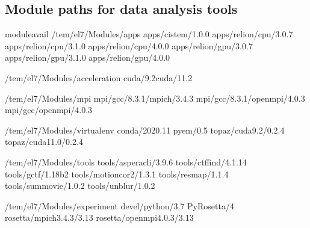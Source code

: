 \documentclass[a4paper,10pt,english]{sphinxmanual}
\begin{document}
\subsection{Module paths for data analysis tools}
\label{\detokenize{newfarm:module-paths-for-data-analysis-tools}}
\begin{sphinxVerbatim}[commandchars=\\\{\}]
\PYGZdl{}\PYGZgt{}moduleavail
\PYGZhy{}\PYGZhy{}\PYGZhy{}\PYGZhy{}\PYGZhy{}\PYGZhy{}\PYGZhy{}\PYGZhy{}/tem/el7/Modules/apps\PYGZhy{}\PYGZhy{}\PYGZhy{}\PYGZhy{}\PYGZhy{}\PYGZhy{}\PYGZhy{}\PYGZhy{}\PYGZhy{}
apps/cistem/1.0.0
apps/relion/cpu/3.0.7
apps/relion/cpu/3.1.0
apps/relion/cpu/4.0.0
apps/relion/gpu/3.0.7
apps/relion/gpu/3.1.0
apps/relion/gpu/4.0.0

\PYGZhy{}\PYGZhy{}\PYGZhy{}\PYGZhy{}/tem/el7/Modules/acceleration\PYGZhy{}\PYGZhy{}\PYGZhy{}\PYGZhy{}\PYGZhy{}
cuda/9.2cuda/11.2

\PYGZhy{}\PYGZhy{}\PYGZhy{}\PYGZhy{}\PYGZhy{}\PYGZhy{}\PYGZhy{}\PYGZhy{}\PYGZhy{}/tem/el7/Modules/mpi\PYGZhy{}\PYGZhy{}\PYGZhy{}\PYGZhy{}\PYGZhy{}\PYGZhy{}\PYGZhy{}\PYGZhy{}\PYGZhy{}
mpi/gcc/8.3.1/mpich/3.4.3
mpi/gcc/8.3.1/openmpi/4.0.3
mpi/gcc/openmpi/4.0.3

\PYGZhy{}\PYGZhy{}\PYGZhy{}\PYGZhy{}\PYGZhy{}/tem/el7/Modules/virtualenv\PYGZhy{}\PYGZhy{}\PYGZhy{}\PYGZhy{}\PYGZhy{}\PYGZhy{}
conda/2020.11
pyem/0.5
topaz/cuda\PYGZhy{}9.2/0.2.4
topaz/cuda\PYGZhy{}11.0/0.2.4

\PYGZhy{}\PYGZhy{}\PYGZhy{}\PYGZhy{}\PYGZhy{}\PYGZhy{}\PYGZhy{}\PYGZhy{}/tem/el7/Modules/tools\PYGZhy{}\PYGZhy{}\PYGZhy{}\PYGZhy{}\PYGZhy{}\PYGZhy{}\PYGZhy{}\PYGZhy{}
tools/aspera\PYGZhy{}cli/3.9.6
tools/ctffind/4.1.14
tools/gctf/1.18\PYGZus{}b2
tools/motioncor2/1.3.1
tools/resmap/1.1.4
tools/summovie/1.0.2
tools/unblur/1.0.2

\PYGZhy{}\PYGZhy{}\PYGZhy{}\PYGZhy{}\PYGZhy{}/tem/el7/Modules/experiment\PYGZhy{}\PYGZhy{}\PYGZhy{}\PYGZhy{}\PYGZhy{}\PYGZhy{}
devel/python/3.7
PyRosetta/4
rosetta/mpich\PYGZhy{}3.4.3/3.13
rosetta/openmpi\PYGZhy{}4.0.3/3.13
\end{sphinxVerbatim}
\end{document}
